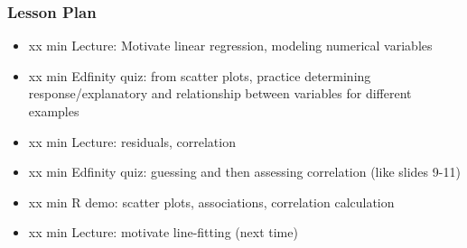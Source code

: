\begin{frame}
    \frametitle{Lesson Plan}
    \begin{itemize}
        \item xx min Lecture: Motivate linear regression, modeling numerical variables
        \item xx min Edfinity quiz: from scatter plots, practice determining response/explanatory and relationship between variables for different examples
        \item xx min Lecture: residuals, correlation
        \item xx min Edfinity quiz: guessing and then assessing correlation (like slides 9-11)
        \item xx min R demo: scatter plots, associations, correlation calculation
        \item xx min Lecture: motivate line-fitting (next time)
    \end{itemize}
\end{frame}



